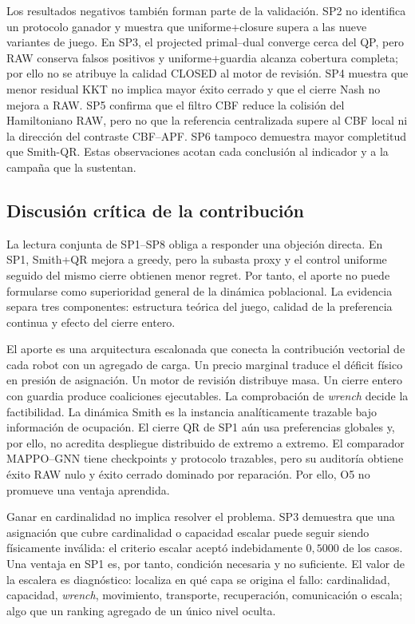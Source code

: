 Los resultados negativos también forman parte de la validación. SP2 no identifica un protocolo ganador y muestra que uniforme+closure supera a las nueve variantes de juego. En SP3, el projected primal--dual converge cerca del QP, pero RAW conserva falsos positivos y uniforme+guardia alcanza cobertura completa; por ello no se atribuye la calidad CLOSED al motor de revisión. SP4 muestra que menor residual KKT no implica mayor éxito cerrado y que el cierre Nash no mejora a RAW. SP5 confirma que el filtro CBF reduce la colisión del Hamiltoniano RAW, pero no que la referencia centralizada supere al CBF local ni la dirección del contraste CBF--APF. SP6 tampoco demuestra mayor completitud que Smith-QR. Estas observaciones acotan cada conclusión al indicador y a la campaña que la sustentan.

\clearpage
\subsection{Discusión crítica de la contribución}
\label{sec:discusion-critica}

La lectura conjunta de SP1--SP8 obliga a responder una objeción directa. En SP1, Smith+QR mejora a greedy, pero la subasta proxy y el control uniforme seguido del mismo cierre obtienen menor regret. Por tanto, el aporte no puede formularse como superioridad general de la dinámica poblacional. La evidencia separa tres componentes: estructura teórica del juego, calidad de la preferencia continua y efecto del cierre entero.

El aporte es una arquitectura escalonada que conecta la contribución vectorial de cada robot con un agregado de carga. Un precio marginal traduce el déficit físico en presión de asignación. Un motor de revisión distribuye masa. Un cierre entero con guardia produce coaliciones ejecutables. La comprobación de \emph{wrench} decide la factibilidad. La dinámica Smith es la instancia analíticamente trazable bajo información de ocupación. El cierre QR de SP1 aún usa preferencias globales y, por ello, no acredita despliegue distribuido de extremo a extremo. El comparador MAPPO--GNN tiene checkpoints y protocolo trazables, pero su auditoría obtiene éxito RAW nulo y éxito cerrado dominado por reparación. Por ello, O5 no promueve una ventaja aprendida.

Ganar en cardinalidad no implica resolver el problema. SP3 demuestra que una asignación que cubre cardinalidad o capacidad escalar puede seguir siendo físicamente inválida: el criterio escalar aceptó indebidamente $0{,}5000$ de los casos. Una ventaja en SP1 es, por tanto, condición necesaria y no suficiente. El valor de la escalera es diagnóstico: localiza en qué capa se origina el fallo: cardinalidad, capacidad, \emph{wrench}, movimiento, transporte, recuperación, comunicación o escala; algo que un ranking agregado de un único nivel oculta.


